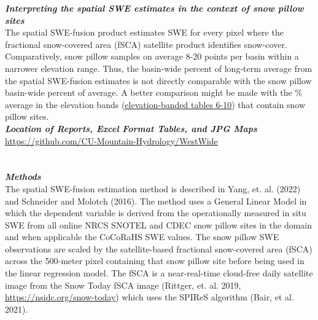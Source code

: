 \documentclass{article}
\begin{document}
\fontsize{12}{16}
\noindent\textbf{\textit{Interpreting the spatial SWE estimates in the context of snow pillow sites}}\\
\fontsize{10}{14}
\noindent The spatial SWE-fusion product estimates SWE for every pixel where the fractional snow-covered area (fSCA) satellite product identifies snow-cover. Comparatively, snow pillow samples on average 8-20 points per basin within a narrower elevation range. Thus, the basin-wide percent of long-term average from the spatial SWE-fusion estimates is not directly comparable with the snow pillow basin-wide percent of average. A better comparison might be made with the \% average in the elevation bands (\href{https://github.com/CU-Mountain-Hydrology/WestWide}{\underline{elevation-banded tables 6-10}}) that contain snow pillow sites.\\

\fontsize{12}{16}
\noindent\textbf{\textit{Location of Reports, Excel Format Tables, and JPG Maps}}\\
\fontsize{10}{14}
\noindent \href{https://github.com/CU-Mountain-Hydrology/WestWide}{\underline{https://github.com/CU-Mountain-Hydrology/WestWide}}

\section*{}\label{sec:methods}\vspace{-3em}
\fontsize{12}{16}
\noindent\textbf{\textit{Methods}}\\
\fontsize{10}{14}
\noindent The spatial SWE-fusion estimation method is described in Yang, et. al. (2022) and Schneider and Molotch (2016). The method uses a General Linear Model in which the dependent variable is derived from the operationally measured in situ SWE from all online NRCS SNOTEL and CDEC snow pillow sites in the domain and when applicable the CoCoRaHS SWE values. The snow pillow SWE observations are scaled by the satellite-based fractional snow-covered area (fSCA) across the 500-meter pixel containing that snow pillow site before being used in the linear regression model. The fSCA is a near-real-time cloud-free daily satellite image from the Snow Today fSCA image (Rittger, et. al. 2019, \href{https://nsidc.org/snow-today}{\underline{https://nsidc.org/snow-today}}) which uses the SPIReS algorithm (Bair, et al. 2021).\\
\end{document}
